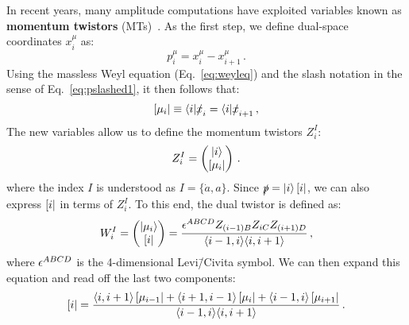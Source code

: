\documentclass[main.tex]{subfiles}
\begin{document}
In recent years, many amplitude computations have exploited variables known as \textbf{momentum twistors} (MTs)~\cite{Hodges:2009hk, Badger:2013gxa, Badger:2016uuq}. As the first step, we define dual-space coordinates $x_i^\mu$ as:
\begin{equation} \label{eq:dualspacedef}
    p_i^\mu = x_i^\mu - x_{i+1}^\mu\,.
\end{equation}
Using the massless Weyl equation (Eq.~\ref{eq:weyleq}) and the slash notation in the sense of Eq.~\ref{eq:pslashed1}, it then follows that:
\begin{equation} \label{eq:incidencerel}
    \left[ \mu_i \right| \equiv \langle i|\slashed{x}_i = \langle i|\slashed{x}_{i+1}\,,
\end{equation}
The new variables allow us to define the momentum twistors $Z_i^I$:
\begin{equation} \label{eq:momtwistor}
    Z_i^I = 
    \begin{pmatrix}
        |i \rangle \\
        \left[ \mu_i \right| 
    \end{pmatrix}\,.
\end{equation}
where the index $I$ is understood as $I=\{\dot{a},a\}$. Since $\slashed{p} = |i \rangle\left[ i \right|$, we can also express $\left[ i \right|$ in terms of $Z_i^I$. To this end, the dual twistor is defined as:
\begin{equation} \label{eq:dualmomtwistor}
    W_i^I = 
    \begin{pmatrix}
        |\mu_i \rangle \\
        \left[ i \right|
    \end{pmatrix} = 
    \frac{\epsilon^{ABCD} Z_{(i-1)B} Z_{iC} Z_{(i+1)D}}{\langle i-1, i \rangle \langle i, i+1 \rangle}\,,
\end{equation}
where $\epsilon^{ABCD}$ is the 4-dimensional Levi\=/Civita symbol. We can then expand this equation and read off the last two components:
\begin{equation}
    \left[ i \right| = \frac{\langle i, i+1 \rangle\left[ \mu_{i-1} \right| + \langle i+1, i-1 \rangle\left[ \mu_i \right| + \langle i-1, i \rangle\left[ \mu_{i+1} \right| }{\langle i-1, i \rangle\langle i, i+1 \rangle}\,.
\end{equation}
\end{document}
